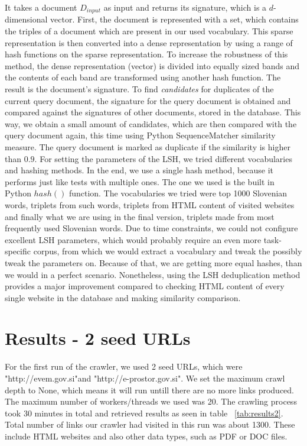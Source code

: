 \documentclass[9pt]{IEEEtran}
\begin{document}
It takes a document $D_{input}$ as input and returns its signature, which is a $d$-dimensional vector.
First, the document is represented with a set, which contains the triples of a document which are present in our used vocabulary.
This sparse representation is then converted into a dense representation by using a range of hash functions on the sparse representation.
To increase the robustness of this method, the dense representation (vector) is divided into equally sized bands and the contents of each band are transformed using another hash function.
The result is the document's signature.
To find \textit{candidates} for duplicates of the current query document, the signature for the query document is obtained and compared against the signatures of other documents, stored in the database.
This way, we obtain a small amount of candidates, which are then compared with the query document again, this time using Python SequenceMatcher similarity measure.
The query document is marked as duplicate if the similarity is higher than $0.9$.
For setting the parameters of the LSH, we tried different vocabularies and hashing methods. 
In the end, we use a single hash method, because it performs just like tests with multiple ones.
The one we used is the built in Python $hash()$ function.
The vocabularies we tried were top 1000 Slovenian words, triplets from such words, triplets from HTML content of visited websites and finally what we are using in the final version, triplets made from most frequently used Slovenian words. 
Due to time constraints, we could not configure excellent LSH parameters, which would probably require an even more task-specific corpus, from which we would extract a vocabulary and tweak the possibly tweak the parameters on.
Because of that, we are getting more equal hashes, than we would in a perfect scenario.
Nonetheless, using the LSH deduplication method provides a major improvement compared to checking HTML content of every single website in the database and making similarity comparison.


\section{Results - 2 seed URLs}\label{sec:results1}
For the first run of the crawler, we used 2 seed URLs, which were "http://evem.gov.si"and "http://e-prostor.gov.si". We set the maximum crawl depth to None, which means it will run untill there are no more links produced. The maximum number of workers/threads we used was 20.
The crawling process took 30 minutes in total and retrieved results as seen in table ~\ref{tab:results2}. Total number of links our crawler had visited in this run was about 1300. These include HTML websites and also other data types, such as PDF or DOC files.
\end{document}

